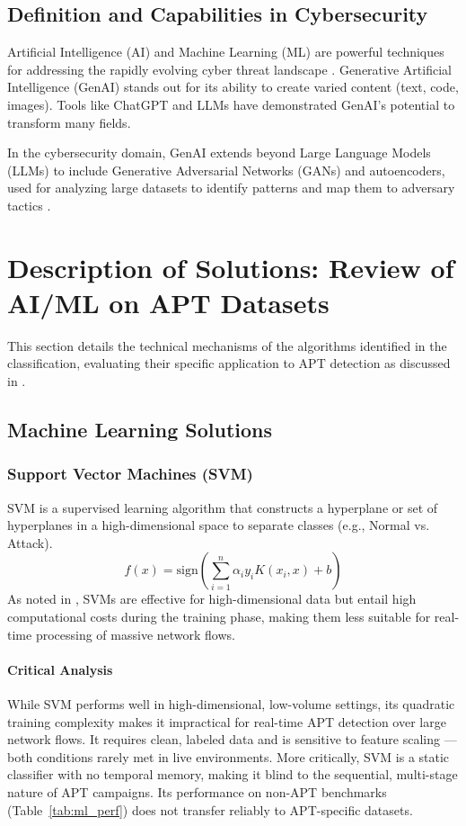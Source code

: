 \subsection{Definition and Capabilities in Cybersecurity}
Artificial Intelligence (AI) and Machine Learning (ML) are powerful techniques for addressing the rapidly evolving cyber threat landscape \cite{jiang2025mitre}. Generative Artificial Intelligence (GenAI) stands out for its ability to create varied content (text, code, images). Tools like ChatGPT and LLMs have demonstrated GenAI's potential to transform many fields.

In the cybersecurity domain, GenAI extends beyond Large Language Models (LLMs) to include Generative Adversarial Networks (GANs) and autoencoders, used for analyzing large datasets to identify patterns and map them to adversary tactics \cite{jiang2025mitre}.



\section{Description of Solutions: Review of AI/ML on APT Datasets}
\label{sec:description}

This section details the technical mechanisms of the algorithms identified in the classification, evaluating their specific application to APT detection as discussed in \cite{ankalaki2025cyber}.

\subsection{Machine Learning Solutions}

\subsubsection{Support Vector Machines (SVM)}
SVM is a supervised learning algorithm that constructs a hyperplane or set of hyperplanes in a high-dimensional space to separate classes (e.g., Normal vs. Attack). 
\begin{equation}
    f(x) = \text{sign}(\sum_{i=1}^{n} \alpha_i y_i K(x_i, x) + b)
\end{equation}
As noted in \cite{ankalaki2025cyber}, SVMs are effective for high-dimensional data but entail high computational costs during the training phase, making them less suitable for real-time processing of massive network flows.

\paragraph{Critical Analysis}
While SVM performs well in high-dimensional, low-volume settings, its quadratic training complexity makes it impractical for real-time APT detection over large network flows. It requires clean, labeled data and is sensitive to feature scaling — both conditions rarely met in live environments. More critically, SVM is a static classifier with no temporal memory, making it blind to the sequential, multi-stage nature of APT campaigns. Its performance on non-APT benchmarks (Table~\ref{tab:ml_perf}) does not transfer reliably to APT-specific datasets.

